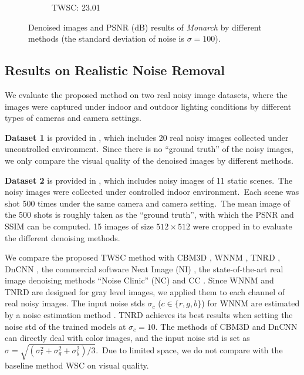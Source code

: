 \begin{figure}
\begin{adjustwidth}{-2cm}{}
\begin{subfigure}[t]{0.19\textwidth}
		\caption{TWSC: 23.01}
    \end{subfigure}
    \caption{Denoised images and PSNR (dB) results of \textsl{Monarch} by different methods (the standard deviation of noise is $\sigma=100$).}
    \label{fig6}
\end{adjustwidth}
\end{figure}




\subsection{Results on Realistic Noise Removal}


We evaluate the proposed method on two real noisy image datasets, where the images were captured under indoor and outdoor lighting conditions by different types of cameras and camera settings. 

\textbf{Dataset 1} is provided in \cite{ncwebsite}, which includes 20 real noisy images collected under uncontrolled environment.\ Since there is no ``ground truth'' of the noisy images, we only compare the visual quality of the denoised images by different methods. 



\textbf{Dataset 2} is provided in \cite{crosschannel2016}, which includes noisy images of 11 static scenes.\ The noisy images were collected under controlled indoor environment.\ Each scene was shot 500 times under the same camera and camera setting.\ The mean image of the 500 shots is roughly taken as the ``ground truth'', with which the PSNR and SSIM \cite{ssim} can be computed. 15 images of size $512\times512$ were cropped in \cite{crosschannel2016} to evaluate the different denoising methods. 


We compare the proposed TWSC method with CBM3D \cite{cbm3d}, WNNM \cite{wnnm}, TNRD \cite{chen2015learning}, DnCNN \cite{dncnn}, the commercial software Neat Image (NI) \cite{neatimage}, the state-of-the-art real image denoising methods ``Noise Clinic'' (NC) \cite{noiseclinic} and CC \cite{crosschannel2016}. Since WNNM and TNRD are designed for gray level images, we applied them to each channel of real noisy images. The input noise stds $\sigma_{c}$ ($c\in\{r,g,b\}$) for WNNM are estimated by a noise estimation method \cite{Chen2015ICCV}. TNRD achieves its best results when setting the noise std of the trained models at $\sigma_{c}=10$. The methods of CBM3D and DnCNN can directly deal with color images, and the input noise std is set as $\sigma=\sqrt{(\sigma_{r}^{2}+\sigma_{g}^{2}+\sigma_{b}^{2})/3}$.\ Due to limited space, we do not compare with the baseline method WSC on visual quality.

